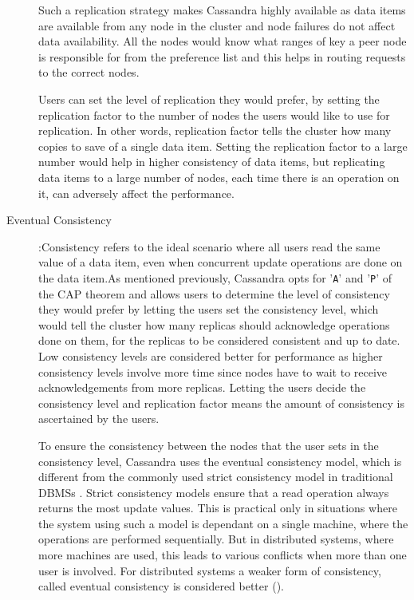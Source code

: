 \begin{description}
Such a replication strategy makes Cassandra highly available as data items are
available from any node in the cluster and node failures do not
affect  data availability. All the nodes would know what ranges of key a
peer node is responsible for from the preference list and this helps in routing
requests to the correct nodes. 

Users can set the level of replication they would prefer, by setting the
replication factor to the number of nodes the users would like to use for
replication. In other words, replication factor tells the cluster how many
copies to save of a single data item. Setting the replication factor to a large
number would help in higher consistency of data items, but replicating data
items to a large number of nodes, each time there is an operation on it,  can
adversely affect the performance.

  \item [Eventual Consistency]:Consistency refers to the ideal scenario where
  all users read the same value of a data item, even when concurrent update
  operations are done on the data item.As mentioned previously, Cassandra opts
  for '\texttt{A}' and '\texttt{P}' of the CAP theorem and allows users to
  determine the level of consistency they would prefer by letting the users set
  the consistency level, which would tell the cluster how many
  replicas should acknowledge operations done on them, for the replicas to be
  considered consistent and up to date. Low consistency levels are considered
  better for performance as higher consistency levels involve more time
  since nodes have to wait to receive acknowledgements from more replicas.
  Letting the users decide the consistency level and replication factor means
  the amount of consistency is ascertained by the users. 

  To ensure the consistency between the nodes that the user sets in the
  consistency level, Cassandra uses the eventual consistency model, which is
  different from the commonly used strict consistency model in traditional
  \acp{DBMS} .
  Strict consistency models ensure that a read operation always returns the most
  update values. This is practical only in situations where the system using
  such a model is dependant on a single machine, where the operations are
  performed sequentially. But in distributed systems, where more machines are
  used, this leads to various conflicts when more than one user is involved. For
  distributed systems a weaker form of consistency, called eventual consistency
  is considered better ().
  

\end{description}
